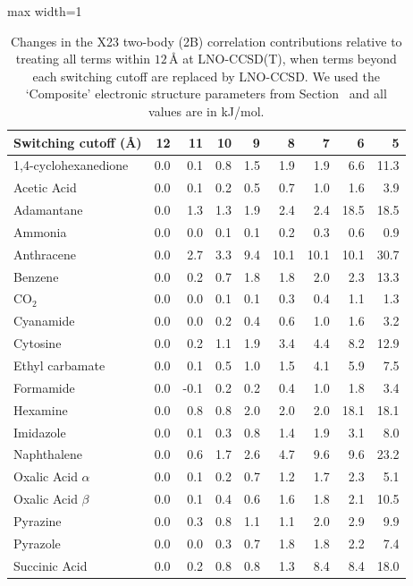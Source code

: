 \begin{table}[h]
\centering
\caption{\label{tab:x23_2b_multilevel_ccsd}Changes in the X23 two-body (2B) correlation contributions relative to treating all terms within $12\,$\AA{} at LNO-CCSD(T), when terms beyond each switching cutoff are replaced by LNO-CCSD. We used the `Composite' electronic structure parameters from Section~ and all values are in kJ/mol.}
\begin{adjustbox}{max width=1\textwidth}
\begin{tabular}{lrrrrrrrr}
\toprule
Switching cutoff (\AA{}) & 12 & 11 & 10 & 9 & 8 & 7 & 6 & 5 \\ 
\midrule
1,4-cyclohexanedione & 0.0 & 0.1 & 0.8 & 1.5 & 1.9 & 1.9 & 6.6 & 11.3 \\
Acetic Acid & 0.0 & 0.1 & 0.2 & 0.5 & 0.7 & 1.0 & 1.6 & 3.9 \\
Adamantane & 0.0 & 1.3 & 1.3 & 1.9 & 2.4 & 2.4 & 18.5 & 18.5 \\
Ammonia & 0.0 & 0.0 & 0.1 & 0.1 & 0.2 & 0.3 & 0.6 & 0.9 \\
Anthracene & 0.0 & 2.7 & 3.3 & 9.4 & 10.1 & 10.1 & 10.1 & 30.7 \\
Benzene & 0.0 & 0.2 & 0.7 & 1.8 & 1.8 & 2.0 & 2.3 & 13.3 \\
CO$_2$ & 0.0 & 0.0 & 0.1 & 0.1 & 0.3 & 0.4 & 1.1 & 1.3 \\
Cyanamide & 0.0 & 0.0 & 0.2 & 0.4 & 0.6 & 1.0 & 1.6 & 3.2 \\
Cytosine & 0.0 & 0.2 & 1.1 & 1.9 & 3.4 & 4.4 & 8.2 & 12.9 \\
Ethyl carbamate & 0.0 & 0.1 & 0.5 & 1.0 & 1.5 & 4.1 & 5.9 & 7.5 \\
Formamide & 0.0 & -0.1 & 0.2 & 0.2 & 0.4 & 1.0 & 1.8 & 3.4 \\
Hexamine & 0.0 & 0.8 & 0.8 & 2.0 & 2.0 & 2.0 & 18.1 & 18.1 \\
Imidazole & 0.0 & 0.1 & 0.3 & 0.8 & 1.4 & 1.9 & 3.1 & 8.0 \\
Naphthalene & 0.0 & 0.6 & 1.7 & 2.6 & 4.7 & 9.6 & 9.6 & 23.2 \\
Oxalic Acid $\alpha$ & 0.0 & 0.1 & 0.2 & 0.7 & 1.2 & 1.7 & 2.3 & 5.1 \\
Oxalic Acid $\beta$ & 0.0 & 0.1 & 0.4 & 0.6 & 1.6 & 1.8 & 2.1 & 10.5 \\
Pyrazine & 0.0 & 0.3 & 0.8 & 1.1 & 1.1 & 2.0 & 2.9 & 9.9 \\
Pyrazole & 0.0 & 0.0 & 0.3 & 0.7 & 1.8 & 1.8 & 2.2 & 7.4 \\
Succinic Acid & 0.0 & 0.2 & 0.8 & 0.8 & 1.3 & 8.4 & 8.4 & 18.0 \\

\end{tabular}
\end{adjustbox}
\end{table}
